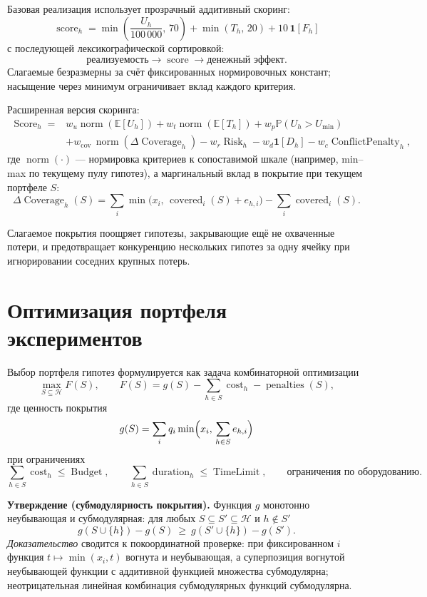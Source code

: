 \documentclass[12pt,a4paper]{article}
\newcommand{\E}{\mathbb{E}}
\newcommand{\Prob}{\mathbb{P}}
\newcommand{\Hyp}{\mathcal{H}}
\DeclareMathOperator{\covered}{covered}
\DeclareMathOperator{\Score}{Score}
\DeclareMathOperator{\norm}{norm}
\DeclareMathOperator{\Risk}{Risk}
\DeclareMathOperator{\Cov}{Coverage}
\begin{document}
Базовая реализация использует прозрачный аддитивный скоринг:
\[
  \operatorname{score}_h
  =
  \min\!\left(\frac{U_h}{100\,000},\,70\right)
  +
  \min(T_h,\,20)
  +
  10\,\mathbf{1}[F_h]
\]
с последующей лексикографической сортировкой:
\[
  \text{реализуемость}
  \to
  \operatorname{score}
  \to
  \text{денежный эффект}.
\]
Слагаемые безразмерны за счёт фиксированных нормировочных констант;
насыщение через минимум ограничивает вклад каждого критерия.

Расширенная версия скоринга:
\[
\begin{aligned}
  \Score_h
  ={}&
  w_u \norm(\E[U_h])
  + w_t \norm(\E[T_h])
  + w_p \Prob(U_h > U_{\min})\\
  &+ w_{\text{cov}}\,\norm(\Delta\Cov_h)
  - w_r \Risk_h
  - w_d \mathbf{1}[D_h]
  - w_c \operatorname{ConflictPenalty}_h,
\end{aligned}
\]
где \(\norm(\cdot)\) --- нормировка критериев к сопоставимой шкале
(например, min--max по текущему пулу гипотез), а маргинальный вклад в
покрытие при текущем портфеле \(S\):
\[
  \Delta\Cov_h(S)
  =
  \sum_i \min\bigl(x_i,\,\covered_i(S)+e_{h,i}\bigr)
  -
  \sum_i \covered_i(S).
\]

Слагаемое покрытия поощряет гипотезы, закрывающие ещё не охваченные потери,
и предотвращает конкуренцию нескольких гипотез за одну ячейку при
игнорировании соседних крупных потерь.

\section{Оптимизация портфеля экспериментов}

Выбор портфеля гипотез формулируется как задача комбинаторной оптимизации
\[
  \max_{S \subseteq \Hyp} F(S),
  \qquad
  F(S) = g(S) - \sum_{h \in S} \operatorname{cost}_h
  - \operatorname{penalties}(S),
\]
где ценность покрытия
\[
  g(S)
  =
  \sum_i q_i
  \min\Bigl(x_i,\,\sum_{h \in S} e_{h,i}\Bigr)
\]
при ограничениях
\[
  \sum_{h \in S} \operatorname{cost}_h \le \operatorname{Budget},
  \qquad
  \sum_{h \in S} \operatorname{duration}_h \le \operatorname{TimeLimit},
  \qquad
  \text{ограничения по оборудованию}.
\]

\begin{mainbox}
\textbf{Утверждение (субмодулярность покрытия).}
Функция \(g\) монотонно неубывающая и субмодулярная: для любых
\(S \subseteq S' \subseteq \Hyp\) и \(h \notin S'\)
\[
  g(S \cup \{h\}) - g(S)
  \ \ge\
  g(S' \cup \{h\}) - g(S').
\]
\emph{Доказательство} сводится к покоординатной проверке: при фиксированном
\(i\) функция \(t \mapsto \min(x_i, t)\) вогнута и неубывающая, а
суперпозиция вогнутой неубывающей функции с аддитивной функцией множества
субмодулярна; неотрицательная линейная комбинация субмодулярных функций
субмодулярна.
\end{mainbox}
\end{document}
